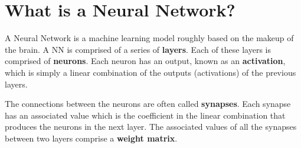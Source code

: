 \documentclass[]{article}
\title{}
\author{}
\begin{document}
\maketitle

\begin{abstract}

\end{abstract}

\section{What is a Neural Network?}

A Neural Network is a machine learning model roughly based on the makeup of the brain. A NN is comprised of a series of \textbf{layers}. Each of these layers is comprised of \textbf{neurons}. Each neuron has an output, known as an \textbf{activation}, which is simply a linear combination of the outputs (activations) of the previous layers.

The connections between the neurons are often called \textbf{synapses}. Each synapse has an associated value which is the coefficient in the linear combination that produces the neurons in the next layer. The associated values of all the synapses between two layers comprise a \textbf{weight matrix}.
\end{document}

